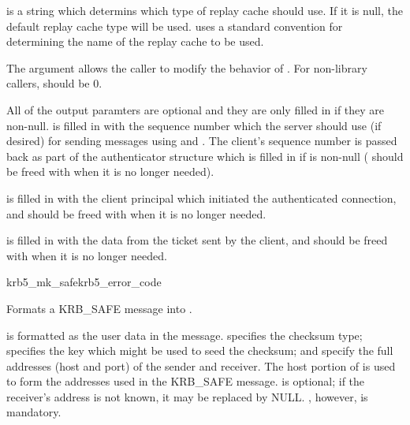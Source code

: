  is a string which determins which type of replay
cache  should use.  If it is null, the default
replay cache type will be used.   uses a
standard convention for determining the name of the replay cache to be
used.

The  argument allows the caller to modify the behavior of
.  For non-library callers, 
should be 0. 


All of the output paramters are optional and they are only filled in
if they are non-null.   is filled in with the
sequence number which the server should use (if desired) for sending
messages using  and
.   The client's sequence number is passed back
as part of the authenticator structure which is filled in if
 is non-null ( should be freed
with  when it is no longer needed).

 is filled in with the client principal which
initiated the authenticated connection, and should be freed with
 when it is no longer needed.

 is filled in with the data from the ticket sent by
the client, and should be freed with  when
it is no longer needed.

\begin{funcdecl}{krb5_mk_safe}{krb5_error_code}{\funcin}
\funcout
{}
\end{funcdecl}

Formats a KRB_SAFE message into .

 is formatted as the user data in the message.
 specifies the checksum type; 
specifies the key which might be used to seed the checksum;
 and  specify the full
addresses (host and port) of the sender and receiver.  The host
portion of  is used to form the addresses used
in the KRB_SAFE message.   is optional; if the
receiver's address is not known, it may be replaced by NULL.
, however, is mandatory.

